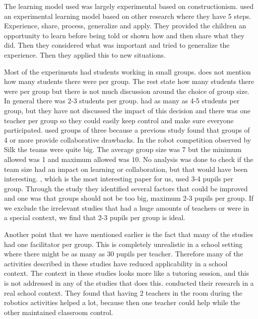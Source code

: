 \bigskip\noindent
The learning model used was largely experimental based on constructionism.  used an experimental learning model based on other research where they have 5 steps. Experience, share, process, generalize and apply. They provided the children an opportunity to learn before being told or shown how and then share what they did. Then they considered what was important and tried to generalize the experience. Then they applied this to new situations.

\bigskip\noindent
Most of the experiments had students working in small groups.  does not mention how many students there were per group. The rest state how many students there were per group but there is not much discussion around the choice of group size. In general there was 2-3 students per group\cite{mitnik2009collaborative, norton2004using, lindh2007does, silk2011resources, nugent2009use, williams2007acquisition}.  had as many as 4-5 students per group, but they have not discussed the impact of this decision and there was one teacher per group so they could easily keep control and make sure everyone participated.  used groups of three because a previous study found that groups of 4 or more provide collaborative drawbacks. In the robot competition observed by Silk \cite{silk2011resources} the teams were quite big. The average group size was 7 but the minimum allowed was 1 and maximum allowed was 10. No analysis was done to check if the team size had an impact on learning or collaboration, but that would have been interesting. , which is the most interesting paper for us, used 3-4 pupils per group. Through the study they identified several factors that could be improved and one was that groups should not be too big, maximum 2-3 pupils per group. If we exclude the irrelevant studies that had a huge amounts of teachers or were in a special context, we find that 2-3 pupils per group is ideal.

\bigskip\noindent
Another point that we have mentioned earlier is the fact that many of the studies had one facilitator per group. This is completely unrealistic in a school setting where there might be as many as 30 pupils per teacher. Therefore many of the activities described in these studies have reduced applicability in a school context. The context in these studies looks more like a tutoring session, and this is not addressed in any of the studies that does this.  conducted their research in a real school context. They found that having 2 teachers in the room during the robotics activities helped a lot, because then one teacher could help while the other maintained classroom control.

